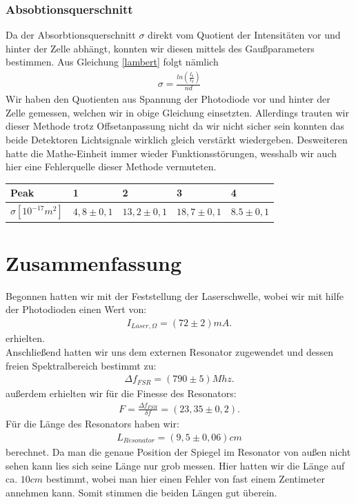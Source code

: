 \documentclass[12pt]{article}
\begin{document}
\subsubsection{Absobtionsquerschnitt}
Da der Absorbtionsquerschnitt $\sigma$ direkt vom Quotient der Intensitäten vor und hinter der Zelle abhängt, konnten wir diesen mittels des Gaußparameters bestimmen. Aus Gleichung \ref{lambert} folgt nämlich
\begin{align*}
 \sigma = \frac{ln \left( \frac{I_0}{I_d} \right) }{nd} 
\end{align*}
Wir haben den Quotienten aus Spannung der Photodiode vor und hinter der Zelle gemessen, welchen wir in obige Gleichung einsetzten. Allerdings trauten wir dieser Methode trotz Offsetanpassung nicht da wir nicht sicher sein konnten das beide Detektoren Lichtsignale wirklich gleich verstärkt wiedergeben. Desweiteren hatte die Mathe-Einheit immer wieder Funktionsstörungen, wesshalb wir auch hier eine Fehlerquelle dieser Methode vermuteten.
\begin{center}
\begin{tabular}{|l|l|l|l|l|}
\hline 
Peak & 1 & 2 & 3 & 4\\
\hline
$\sigma [10^{-17} m^2]$ & $4,8 \pm 0,1$ & $13,2 \pm 0,1$ & $18,7 \pm 0,1$ & $8.5 \pm 0,1$\\
\hline
\end{tabular}
\end{center}

\section{Zusammenfassung}
Begonnen hatten wir mit der Feststellung der Laserschwelle, wobei wir mit hilfe der Photodioden einen Wert von:
\begin{align*}
 I_{Laser, \Omega} = (72 \pm 2) mA. 
\end{align*}
erhielten.\\

Anschließend hatten wir uns dem externen Resonator zugewendet und dessen freien Spektralbereich bestimmt zu:
\begin{align*}
 \Delta f_{FSR} = (790\pm5) Mhz.
\end{align*}
außerdem erhielten wir für die Finesse des Resonators:
\begin{align*}
 F = \frac{\Delta f_{FSR}}{\delta f} = ( 23,35 \pm 0,2 ).
\end{align*}
Für die Länge des Resonators haben wir:
\begin{align*}
 L_{Resonator}= (9,5 \pm 0,06) cm
\end{align*}
berechnet. Da man die genaue Position der Spiegel im Resonator von außen nicht sehen kann lies sich seine Länge nur grob messen. Hier hatten wir die Länge auf ca. $10cm$ bestimmt, wobei man hier einen Fehler von fast einem Zentimeter annehmen kann. Somit stimmen die beiden Längen gut überein.\\
\end{document}
